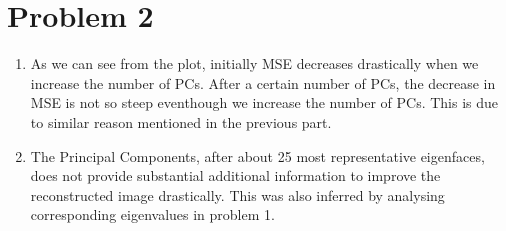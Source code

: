 \documentclass[11pt,letterpaper]{article}
\begin{document}
\section*{Problem 2}
\begin{figure}[htbp]
    \centering
    \end{figure}
\begin{enumerate}
    [label=$\bullet$]
    \item As we can see from the plot, initially MSE decreases drastically when we increase the number of PCs. After a certain number of PCs, the decrease in MSE is not so steep eventhough we increase the number of PCs. This is due to similar reason mentioned in the previous part. 
    \item The Principal Components, after about 25 most representative eigenfaces, does not provide substantial additional information to improve the reconstructed image drastically. This was also inferred by analysing corresponding eigenvalues in problem 1. 
\end{enumerate}
\begin{figure}[htbp]
    \centering
     \\
    \end{figure}
\end{document}
